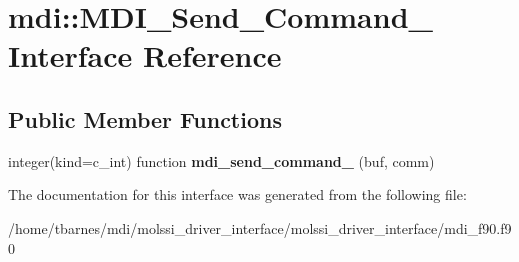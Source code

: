 \hypertarget{interfacemdi_1_1MDI__Send__Command__}{\section{mdi\-:\-:M\-D\-I\-\_\-\-Send\-\_\-\-Command\-\_\- Interface Reference}
\label{interfacemdi_1_1MDI__Send__Command__}
}
\subsection*{Public Member Functions}
\begin{DoxyCompactItemize}
\item 
\hypertarget{interfacemdi_1_1MDI__Send__Command___ad79374503988a8b76342367a2b38feb5}{integer(kind=c\-\_\-int) function {\bfseries mdi\-\_\-send\-\_\-command\-\_\-} (buf, comm)}\label{interfacemdi_1_1MDI__Send__Command___ad79374503988a8b76342367a2b38feb5}

\end{DoxyCompactItemize}


The documentation for this interface was generated from the following file\-:\begin{DoxyCompactItemize}
\item 
/home/tbarnes/mdi/molssi\-\_\-driver\-\_\-interface/molssi\-\_\-driver\-\_\-interface/mdi\-\_\-f90.\-f90\end{DoxyCompactItemize}
